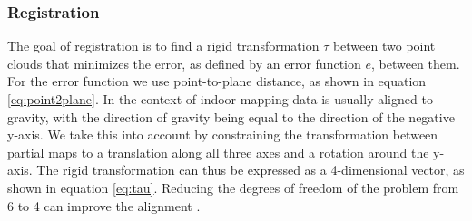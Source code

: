 
\subsubsection{Registration}

The goal of \gls{registration} is to find a rigid transformation \(\tau\) between two point clouds that minimizes the error, as defined by an error function \(e\), between them. For the error function we use point-to-plane distance, as shown in equation \ref{eq:point2plane}. In the context of indoor mapping data is usually aligned to gravity, with the direction of gravity being equal to the direction of the negative y-axis. We take this into account by constraining the transformation between partial maps to a translation along all three axes and a rotation around the y-axis. The rigid transformation can thus be expressed as a 4-dimensional vector, as shown in equation \ref{eq:tau}. Reducing the degrees of freedom of the problem from 6 to 4 can improve the alignment \citep{kubelka_gravity-constrained_2022}.


